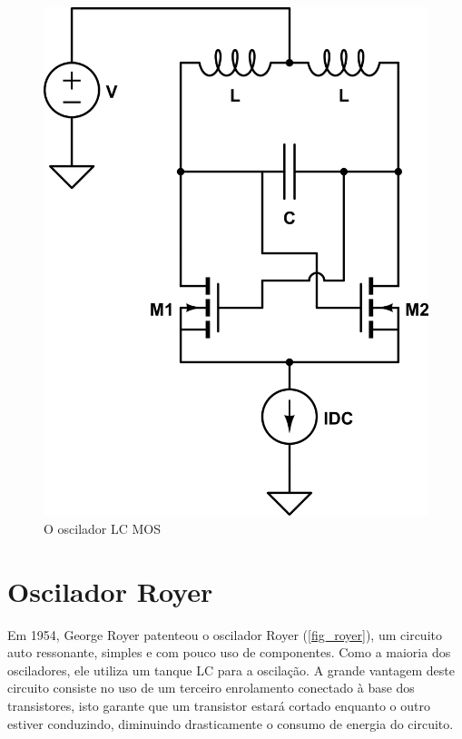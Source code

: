 \begin{figure}[htb]
\caption{\label{fig_lc-mos}O oscilador LC MOS}
\begin{center}
\includegraphics[scale=0.5]{images/lc-mos.png}
\end{center}
\end{figure}

\section{Oscilador Royer}
Em 1954, George Royer patenteou o oscilador Royer (\autoref{fig_royer}), um circuito auto ressonante, simples e com pouco uso de componentes. Como a maioria dos osciladores, ele utiliza um tanque LC para a oscilação. A grande vantagem deste circuito consiste no uso de um terceiro enrolamento conectado à base dos transistores, isto garante que um transistor estará cortado enquanto o outro estiver conduzindo, diminuindo drasticamente o consumo de energia do circuito.

